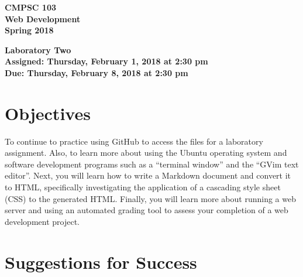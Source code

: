 \documentclass[11pt]{article}
\newcommand{\assignmentduedate}{February 8}
\newcommand{\assignmentassignedate}{February 1}
\newcommand{\assignmentnumber}{Two}
\newcommand{\labyear}{2018}
\newcommand{\labday}{Thursday}
\newcommand{\labtime}{2:30 pm}
\newcommand{\assigneddate}{Assigned: \labday, \assignmentassignedate, \labyear{} at \labtime{}}
\newcommand{\duedate}{Due: \labday, \assignmentduedate, \labyear{} at \labtime{}}
\newcommand{\labtitle}[1]
{
  \begin{center}
    \begin{center}
      \bf
      CMPSC 103\\Web Development\\
      Spring 2018\\
      \medskip
    \end{center}
    \bf
    #1
  \end{center}
}
\begin{document}
\thispagestyle{empty}

\labtitle{Laboratory \assignmentnumber{} \\ \assigneddate{} \\ \duedate{}}

\section*{Objectives}

To continue to practice using GitHub to access the files for a laboratory
assignment. Also, to learn more about using the Ubuntu operating system and
software development programs such as a ``terminal window'' and the ``GVim text
editor''. Next, you will learn how to write a Markdown document and convert it
to HTML, specifically investigating the application of a cascading style sheet
(CSS) to the generated HTML. Finally, you will learn more about running a web
server and using an automated grading tool to assess your completion of a web
development project.

\section*{Suggestions for Success}
\end{document}
